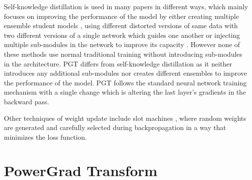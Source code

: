\documentclass[times,sort&compress]{elsarticle}
\begin{document}
Self-knowledge distillation is used in many papers in different ways, which mainly
focuses on improving the performance of the model by either creating multiple ensemble
student models \cite{zhang2018deep}, using different distorted versions of same data
with two different versions of a single network which guides one another
\cite{xu2019data} or injecting multiple sub-modules in the network to improve its
capacity \cite{zhang2019your}. However none of these methods use normal traditional
training without introducing sub-modules in the architecture. PGT differs from
self-knowledge distillation as it neither introduces any additional sub-modules nor
creates different ensembles to improve the performance of the model. PGT follows the
standard neural network training mechanism with a single change which is altering the
last layer's gradients in the backward pass.


Other techniques of weight update include slot machines \cite{aladago2021slot}, where
random weights are generated and carefully selected during backpropagation in a way that
minimizes the loss function.









\section{PowerGrad Transform}
\label{sec:Powe}
\end{document}
